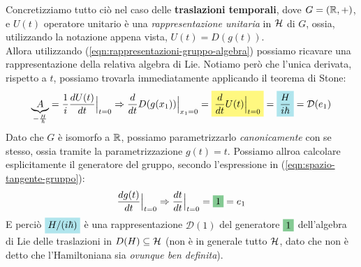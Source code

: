 \documentclass[../../FisicaTeorica.tex]{subfiles}
\begin{document}
Concretizziamo tutto ciò nel caso delle \textbf{traslazioni temporali}, dove $G=(\mathbb{R},+)$, e $U(t)$ operatore unitario è una \textit{rappresentazione unitaria} in $\mathcal{H}$ di $G$, ossia, utilizzando la notazione appena vista, $U(t) = D(g(t))$.\\
Allora utilizzando (\ref{eqn:rappresentazioni-gruppo-algebra}) possiamo ricavare una rappresentazione della relativa algebra di Lie. Notiamo però che l'unica derivata, rispetto a $t$, possiamo trovarla immediatamente applicando il teorema di Stone:
\[
\underbrace{A}_{-\frac{H}{\hbar}}=\frac{1}{i}\frac{dU(t)}{dt}\Big|_{t=0}\Rightarrow \frac{d}{dt} D(g(x_1))\Big|_{x_1=0}=
\hlc{Yellow}{\frac{d}{dt}U(t)\Big|_{t=0}}=\hlc{SkyBlue}{\frac{H}{i\hbar}} = \mathcal{D}(e_1)
\]
Dato che $G$ è isomorfo a $\mathbb{R}$, possiamo parametrizzarlo \textit{canonicamente} con se stesso, ossia tramite la parametrizzazione $g(t)=t$. Possiamo allroa calcolare esplicitamente il generatore del gruppo, secondo l'espressione in (\ref{eqn:spazio-tangente-gruppo}):
\[
\frac{dg(t)}{dt}\Big|_{t=0}\Rightarrow 
\frac{dt}{dt} \Big|_{t=0} = \hlc{ForestGreen}{1} = e_1
\]
E perciò $\hlc{SkyBlue}{H/(i\hbar)}$ è una rappresentazione $\mathcal{D}(1)$ del generatore $\hlc{ForestGreen}{1}$ dell'algebra di Lie delle traslazioni in $D(H) \subseteq \mathcal{H}$ (non è in generale tutto $\mathcal{H}$, dato che non è detto che l'Hamiltoniana sia \textit{ovunque ben definita}).\\
\end{document}
